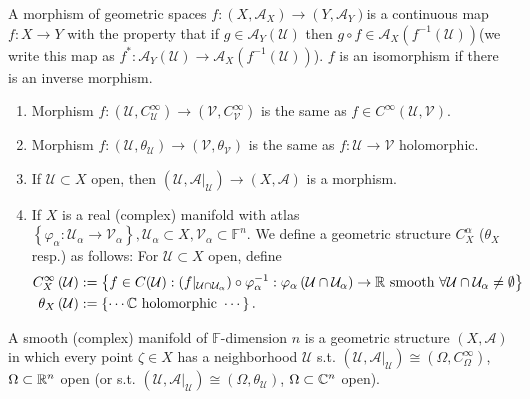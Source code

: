 \begin{definition}  
A morphism of geometric spaces $f:(X,\mathcal{A}_X)\to \left( Y,\mathcal{A}_Y \right) $is a continuous map $f:X\to Y$ with the property that if $g\in \mathcal{A}_Y(\mathcal{U})$ then $g\circ f\in \mathcal{A}_X\left( f^{-1}\left( \mathcal{U} \right)  \right) $(we write this map as $f^{*}:\mathcal{A}_Y(\mathcal{U})\to \mathcal{A}_X\left( f^{-1}(\mathcal{U}) \right) $). $f$ is an isomorphism if there is an inverse morphism.
\end{definition}

\begin{example}
\begin{enumerate}
  \item Morphism $f:\left( \mathcal{U},C_{\mathcal{U}}^{\infty} \right) \to \left( \mathcal{V},C_{\mathcal{V}}^{\infty} \right) $ is the same as $f \in C^{\infty}\left( \mathcal{U},\mathcal{V} \right) $.
  \item Morphism $f:\left( \mathcal{U},\theta _{\mathcal{U}} \right) \to \left( \mathcal{V},\theta _{\mathcal{V}} \right) $ is the same as $f:\mathcal{U}\to \mathcal{V}$ holomorphic.
  \item If $\mathcal{U}\subset X$ open, then $\left( \mathcal{U}, \mathcal{A}|_{\mathcal{U}} \right)\to \left( X,\mathcal{A} \right)  $ is a morphism.
  \item If  $X$ is a real (complex) manifold  with atlas $\left\{\varphi_{\alpha}:\mathcal{U}_{\alpha}\to \mathcal{V}_{\alpha}\right\},\mathcal{U}_\alpha \subset X,\mathcal{V}_{\alpha}\subset \mathbb{F}^{n}$. We define a geometric structure $C_{X}^{\alpha}$ ($\theta _{X}$ resp.) as follows: For $\mathcal{U}\subset X$ open, define
    \begin{align*}
      C_X^{\infty}\left( \mathcal{U} \right) &:=\left\{f\in C(\mathcal{U}):(f|_{\mathcal{U}\cap \mathcal{U}_\alpha})\circ \varphi_\alpha ^{-1}:\varphi_\alpha\left( \mathcal{U}\cap \mathcal{U}_\alpha  \right) \to \mathbb{R} \text{ smooth }\forall \mathcal{U}\cap \mathcal{U}_\alpha\neq \emptyset\right\}\\
      \theta _X\left( \mathcal{U} \right) &:=\left\{\cdots \mathbb{C} \text{ holomorphic }\cdots \right\}
    .\end{align*}
\end{enumerate}  
\end{example}
\begin{definition}
  A smooth (complex) manifold of $\mathbb{F}$-dimension $n$ is a geometric structure $\left( X,\mathcal{A} \right) $ in which every point $\zeta\in X$ has a neighborhood $\mathcal{U}$ s.t. $\left( \mathcal{U},\mathcal{A}|_{\mathcal{U}} \right) \cong \left( \Omega,C^{\infty}_{\Omega} \right) $, $\Omega\subset \mathbb{R}^{n}$ open (or s.t.  $\left( \mathcal{U},\mathcal{A}|_{\mathcal{U}} \right) \cong \left( \Omega, \theta _{\mathcal{U}} \right) $, $\Omega\subset \mathbb{C}^{n}$ open).
\end{definition}
